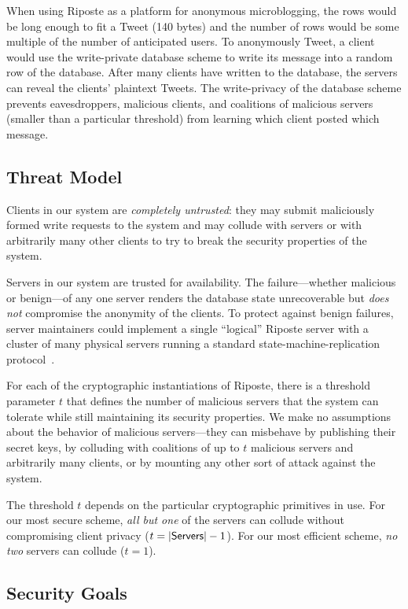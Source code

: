 \documentclass[10pt,twocolumn]{article}
\newcommand{\name}{Riposte\xspace}
\begin{document}
When using \name as a platform for anonymous microblogging, the rows
would be long enough to fit a Tweet (140 bytes) and the number of rows would be
some multiple of the number of anticipated users.
To anonymously Tweet, a client would use the write-private database scheme to 
write its message into a random row of the database.
After many clients have written to the database, the servers can
reveal the clients' plaintext Tweets.
The write-privacy of the database scheme prevents eavesdroppers, malicious clients, 
and coalitions of malicious servers (smaller than a particular threshold) from
learning which client posted which message.

\subsection{Threat Model}
\label{sec:goal:threat}

Clients in our system are {\em completely untrusted}: they
may submit maliciously formed write requests to the system
and may collude with servers or with arbitrarily many other
clients to try to break the security properties of the system.

Servers in our system are trusted for availability. 
The failure---whether malicious or benign---of any one server 
renders the database state unrecoverable but {\em does not}
compromise the anonymity of the clients.
To protect against benign failures, server maintainers could
implement a single ``logical'' \name server with a cluster
of many physical servers running a
standard state-machine-replication 
protocol~\cite{liskov2012viewstamped,ongaro2014search}.

For each of the cryptographic instantiations of \name, there is a
threshold parameter $t$ that defines the number of malicious servers
that the system can tolerate while still maintaining its security
properties.  We make no assumptions about the behavior of malicious
servers---they can misbehave 
by publishing their secret keys, 
by colluding with coalitions of up
to $t$ malicious servers and arbitrarily many clients, 
or by mounting any other sort of attack against the system.

The threshold $t$ depends on the particular 
cryptographic primitives in use.
For our most secure scheme, {\em all but one} of the servers can
collude without compromising client privacy ($t = |{\sf Servers}| - 1$).
For our most efficient scheme, {\em no two} servers can collude ($t=1$).

\subsection{Security Goals}
\end{document}
